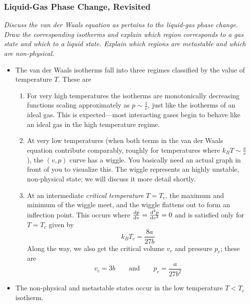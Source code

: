 \documentclass[11pt, a4paper]{article}
\begin{document}
\subsubsection{Liquid-Gas Phase Change, Revisited} \label{sss:liq_gas_phase_change}
\textit{Discuss the van der Waals equation as pertains to the liquid-gas phase change. Draw the corresponding isotherms and explain which region corresponds to a gas state and which to a liquid state. Explain which regions are metastable and which are non-physical.}

\iffalse
\begin{itemize}

	\item The van der Waals isotherms fall into three regimes classified by the value of temperature $ T $. These are
	\begin{enumerate}
		\item For very high temperatures the isotherms are monotonically decreasing functions scaling approximately as $ p \sim \frac{1}{v} $, just like the isotherms of an ideal gas. This is expected---most interacting gases begin to behave like an ideal gas in the high temperature regime.
				
		\item At very low temperatures (when both terms in the van der Waals equation contribute comparably, roughly for temperatures where $ k_{B}T \sim \frac{a}{v} $), the $ (v, p) $ curve has a wiggle. You basically need an actual graph in front of you to visualize this. The wiggle represents an highly unstable, non-physical state; we will discuss it more detail shortly.
				
		\item At an intermediate \textit{critical temperature}  $ T = T_{c} $, the maximum and minimum of the wiggle meet, and the wiggle flattens out to form an inflection point. This occurs where $ \dv{p}{v} = \dv[2]{p}{v} = 0 $ and is satisfied only for $ T = T_{c} $ given by
		\begin{equation*}
			k_{B}T_{c} = \frac{8a}{27b}
		\end{equation*}
		Along the way, we also get the critical volume $ v_{c} $ and pressure $ p_{c} $; these are
		\begin{equation*}
			v_{c} = 3b \qquad \text{and} \qquad p_{c} = \frac{a}{27b^{2}}
		\end{equation*}
	\end{enumerate}
	
	\item The non-physical and metastable states occur in the low temperature $ T < T_{c} $ isotherm. 	
	

\end{itemize}
\end{document}
